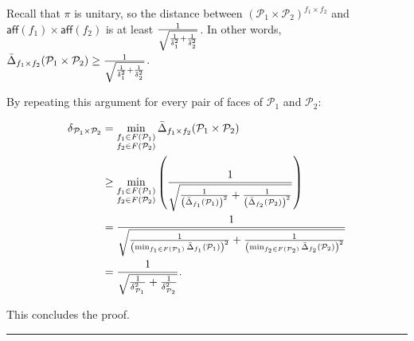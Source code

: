 \documentclass[twoside]{article}
\newcommand{\R}{\mathbb{R}}
\newcommand{\jmlrBlackBox}{\rule{1.5ex}{1.5ex}}
\newcommand{\jmlrQED}{\hfill\jmlrBlackBox\par\bigskip}
\providecommand{\proofname}{Proof}
\renewenvironment{proof}{\par\noindent{\bfseries\upshape \proofname\ }}{\jmlrQED}
\newcommand{\mP}{\mathcal{P}}
\newcommand{\aff}[1]{\mathsf{aff}\left(#1\right)}
\begin{document}
\begin{proof}
  Recall that $\pi$ is unitary, so the distance between $\left(\mP_1\times \mP_2\right)^{f_1\times f_2}$ and $\aff{f_1}\times \aff{f_2}$ is at least $\frac{1}{\sqrt{\frac{1}{\operatorname{\bar{\delta}}_1^2}+\frac{1}{\operatorname{\bar{\delta}}_2^2}}}$. In other words, $\whatface{f_1\times f_2}{\mP_1\times \mP_2}\geq \frac{1}{\sqrt{\frac{1}{\what_1^2}+\frac{1}{\what_2^2}}}$.

  By repeating this argument for every pair of faces of $\mP_1$ and $\mP_2$:

   \begin{align*}
     \w{\mP_1\times \mP_2} &= \min_{\substack{f_1\in F(\mP_1)\\ f_2\in F(\mP_2)}} \whatface{f_1\times f_2}{\mP_1\times \mP_2} \\
               &\geq \min_{\substack{f_1\in F(\mP_1)\\ f_2\in F(\mP_2)}} \left(\frac{1}{\sqrt{\frac{1}{\left(\whatface{f_1}{\mP_1}\right)^2} + \frac{1}{\left(\whatface{f_2}{\mP_2}\right)^2} }} \right) \\
               &= \frac{1}{\sqrt{\frac{1}{\left(\min_{f_1\in F(\mP_1)}\whatface{f_1}{\mP_1}\right)^2}+\frac{1}{\left(\min_{f_2\in F(\mP_2)}\whatface{f_2}{\mP_2}\right)^2}}} \\
               &= \frac{1}{\sqrt{\frac{1}{\w{\mP_1}^2}+\frac{1}{\w{\mP_2}^2}}}.
   \end{align*}

   This concludes the proof.
\end{proof}

\end{document}
